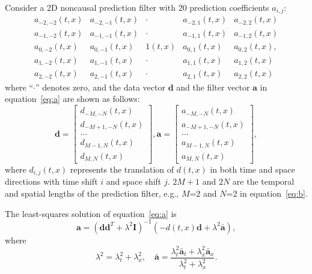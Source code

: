 Consider a 2D noncausal prediction filter with 20 prediction
coefficients $a_{i,j}$:
\begin{equation}
  \label{eq:b}
\begin{array}{ccccc}
a_{-2,-2}(t,x) & a_{-2,-1}(t,x) & \cdot & a_{-2,1}(t,x) & a_{-2,2}(t,x)\\
a_{-1,-2}(t,x) & a_{-1,-1}(t,x) & \cdot & a_{-1,1}(t,x) & a_{-1,2}(t,x)\\
a_{0,-2}(t,x) & a_{0,-1}(t,x) & 1(t,x) & a_{0,1}(t,x) & a_{0,2}(t,x),\\
a_{1,-2}(t,x) & a_{1,-1}(t,x) & \cdot & a_{1,1}(t,x) & a_{1,2}(t,x)\\
a_{2,-2}(t,x) & a_{2,-1}(t,x) & \cdot & a_{2,1}(t,x) & a_{2,2}(t,x)
\end{array}
\end{equation}
where ``$\cdot$'' denotes zero, and the data vector $\mathbf{d}$ and
the filter vector $\mathbf{a}$ in equation~\ref{eq:a} are shown as
follows:
\begin{equation}
  \label{eq:c}
\mathbf{d}=\left[ \begin{array}{c}
d_{-M,-N}(t,x)\\
d_{-M+1,-N}(t,x)\\
\ldots\\
d_{M-1,N}(t,x)\\
d_{M,N}(t,x)
\end{array}\right],
\mathbf{a}=\left[ \begin{array}{c}
a_{-M,-N}(t,x)\\
a_{-M+1,-N}(t,x)\\
\ldots\\
a_{M-1,N}(t,x)\\
a_{M,N}(t,x)
\end{array}\right],
\end{equation}
where $d_{i,j}(t,x)$ represents the translation of $d(t,x)$ in both
time and space directions with time shift $i$ and space shift
$j$. $2M+1$ and $2N$ are the temporal and spatial lengths of the
prediction filter, e.g., $M$=2 and $N$=2 in
equation~\ref{eq:b}.

The least-squares solution of equation~\ref{eq:a} is
\begin{equation}
  \label{eq:d}
\mathbf{a}=(\mathbf{d}\mathbf{d}^T+\lambda^2\mathbf{I})^{-1}(-d(t,x)
\mathbf{d}+\lambda^2\mathbf{\bar{a}}),
\end{equation}
where 
\begin{equation}
  \label{eq:e}
\lambda^2=\lambda_t^2+\lambda_x^2,
\quad\mathbf{\bar{a}}=\frac{\lambda_t^2\mathbf{\bar{a}}_t+
\lambda_x^2\mathbf{\bar{a}}_x}{\lambda_t^2+\lambda_x^2}.
\end{equation}

